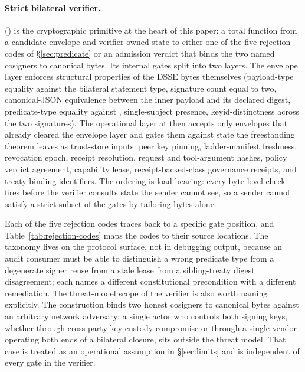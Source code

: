 \paragraph{Strict bilateral verifier.}  () is the cryptographic primitive at the heart of this paper: a total function from a candidate envelope and verifier-owned state to either one of the five rejection codes of \S\ref{sec:predicate} or an admission verdict that binds the two named cosigners to canonical bytes. Its internal gates split into two layers. The envelope layer enforces structural properties of the DSSE bytes themselves (payload-type equality against the bilateral statement type, signature count equal to two, canonical-JSON equivalence between the inner payload and its declared digest, predicate-type equality against , single-subject presence, keyid-distinctness across the two signatures). The operational layer at  then accepts only envelopes that already cleared the envelope layer and gates them against state the freestanding theorem leaves as trust-store inputs: peer key pinning, ladder-manifest freshness, revocation epoch, receipt resolution, request and tool-argument hashes, policy verdict agreement, capability lease, receipt-backed-class governance receipts, and treaty binding identifiers. The ordering is load-bearing: every byte-level check fires before the verifier consults state the sender cannot see, so a sender cannot satisfy a strict subset of the gates by tailoring bytes alone.

Each of the five rejection codes traces back to a specific gate position, and Table~\ref{tab:rejection-codes} maps the codes to their source locations. The taxonomy lives on the protocol surface, not in debugging output, because an audit consumer must be able to distinguish a wrong predicate type from a degenerate signer reuse from a stale lease from a sibling-treaty digest disagreement; each names a different constitutional precondition with a different remediation. The threat-model scope of the verifier is also worth naming explicitly. The construction binds two honest cosigners to canonical bytes against an arbitrary network adversary; a single actor who controls both signing keys, whether through cross-party key-custody compromise or through a single vendor operating both ends of a bilateral closure, sits outside the threat model. That case is treated as an operational assumption in \S\ref{sec:limits} and is independent of every gate in the verifier.

